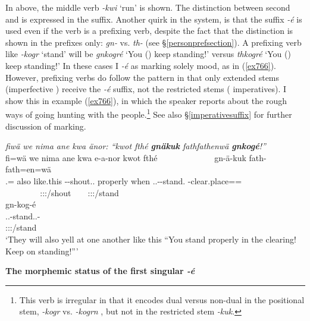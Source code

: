 In  above, the middle verb \emph{-kwi} `run' is shown. The distinction between second  and  is expressed in the suffix. Another quirk in the system, is that the suffix \emph{-é} is used even if the verb is a prefixing verb, despite the fact that the  distinction is shown in the prefixes only: \emph{gn-} \Ssg{} vs. \emph{th-} \Snsg{} (see \S\ref{personprefsection}). A prefixing verb like \emph{-kogr} `stand' will be \emph{gnkogré} `You (\Sg) keep standing!' versus \emph{thkogré} `You (\Pl) keep standing!' In these cases I  \emph{-é} as marking solely  mood, as in (\ref{ex766}). However, prefixing verbs do follow the pattern in that only extended stems (imperfective ) receive the \emph{-é} suffix, not the restricted stems ( imperatives). I show this in example (\ref{ex766}), in which the speaker reports about the rough ways of going hunting with the  people.\footnote{This verb is irregular in that it encodes dual versus non-dual in the positional stem, \emph{-kogr} \Ndu{} vs. \emph{-kogrn} \Du{}, but not in the restricted stem \emph{-kuk}.} See also \S\ref{imperativesuffix} for further discussion of  marking.

\begin{exe}
	\ex \emph{fiwä we nima ane kwa änor: ``kwot fthé \textbf{gnäkuk} fathfathenwä \textbf{gnkogé}!''}\\
	\glll fi=wä we nima ane kwa e-a-nor kwot fthé~~~~~~~~~~~~~ gn-ä-kuk fath-fath=en=wä\\
	\Third.\Abs{}=\Emph{} also like.this \Dem{} \Fut{} \Stnsg-\Vc-shout.\Ext.\Ndu{} properly when \Ssg.\Bet.\Imp-\Ndu-stand.\Rs{} \Redup-clear.place=\Loc=\Emph{}\\
	~ ~ ~ ~ ~ {\footnotesize \Tpl:\Sbj:\Nonpast:\Ipfv/shout} ~ ~ {\footnotesize \Ssg:\Sbj:\Imp:\Pfv/stand} ~\\
	\sn
	\glll gn-kog-é\\
	\Ssg.\Bet.\Imp-stand.\Ext.\Ndu-\Imp{}\\
	{\footnotesize \Ssg:\Sbj:\Imp:\Ipfv/stand}\\
	\trans `They will also yell at one another like this ``You stand properly in the clearing! Keep on standing!''' 
	\label{ex766}
\end{exe}

\noindent
\textbf{The morphemic status of the first singular \emph{-é}}%

